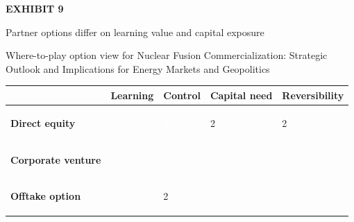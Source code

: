 \documentclass[10pt,a4paper]{article}
\begin{document}
\clearpage
{\textcolor{BOGreen}{\scriptsize\bfseries EXHIBIT 9}}\par\vspace{4pt}
{\sffamily\fontsize{17}{21}\selectfont\color{BONavy} Partner options differ on learning value and capital exposure}\par
{\small\color{BOText} Where-to-play option view for Nuclear Fusion Commercialization: Strategic Outlook and Implications for Energy Markets and Geopolitics}\par\vspace{6pt}
{\scriptsize\begin{tabular}{p{38mm}>{\centering\arraybackslash}p{21mm}>{\centering\arraybackslash}p{21mm}>{\centering\arraybackslash}p{21mm}>{\centering\arraybackslash}p{21mm}}
 & {\bfseries Learning} & {\bfseries Control} & {\bfseries Capital need} & {\bfseries Reversibility} \\
\hline
{\bfseries Direct equity} & \colorbox{BOGreen}{\textcolor{white}{\strut\hspace{5pt}5\hspace{5pt}}} & \colorbox{BOGreen}{\textcolor{white}{\strut\hspace{5pt}4\hspace{5pt}}} & \colorbox{BOLight}{\textcolor{BOText}{\strut\hspace{5pt}2\hspace{5pt}}} & \colorbox{BOLight}{\textcolor{BOText}{\strut\hspace{5pt}2\hspace{5pt}}} \\
{\bfseries Corporate venture} & \colorbox{BOGreen}{\textcolor{white}{\strut\hspace{5pt}4\hspace{5pt}}} & \colorbox{BOBlue}{\textcolor{white}{\strut\hspace{5pt}3\hspace{5pt}}} & \colorbox{BOBlue}{\textcolor{white}{\strut\hspace{5pt}3\hspace{5pt}}} & \colorbox{BOBlue}{\textcolor{white}{\strut\hspace{5pt}3\hspace{5pt}}} \\
{\bfseries Offtake option} & \colorbox{BOBlue}{\textcolor{white}{\strut\hspace{5pt}3\hspace{5pt}}} & \colorbox{BOLight}{\textcolor{BOText}{\strut\hspace{5pt}2\hspace{5pt}}} & \colorbox{BOGreen}{\textcolor{white}{\strut\hspace{5pt}4\hspace{5pt}}} & \colorbox{BOGreen}{\textcolor{white}{\strut\hspace{5pt}4\hspace{5pt}}} \\

\end{tabular}}
\end{document}

